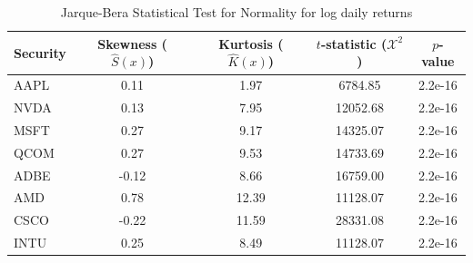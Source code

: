 \documentclass[12pt]{article}
\begin{document}
\begin{table}[ht]
	\centering
	\caption{Jarque-Bera Statistical Test for Normality for log daily returns}
	\begin{tabular}[t]{lcccc}
		\toprule
		Security & Skewness ($\hat{S}(x)$) & Kurtosis ($\hat{K}(x)$) & $t$-statistic ($\mathcal{X}^2$) & $p$-value \\
		\midrule
		AAPL & 0.11 & 1.97 & 6784.85 & 2.2e-16\\
		NVDA & 0.13 & 7.95 & 12052.68 & 2.2e-16\\		
		MSFT & 0.27 & 9.17 & 14325.07 & 2.2e-16  \\
		QCOM & 0.27 & 9.53 & 14733.69 & 2.2e-16 \\
		ADBE & -0.12 & 8.66 & 16759.00 & 2.2e-16 \\	   
		AMD  & 0.78 & 12.39 & 11128.07 & 2.2e-16 \\				   
		CSCO  &  -0.22 & 11.59 & 28331.08 & 2.2e-16 \\					
		INTU  &  0.25 & 8.49 & 11128.07 & 2.2e-16 \\					
		\bottomrule
	\end{tabular}\label{tab:jbtest}
\end{table}
\end{document}
